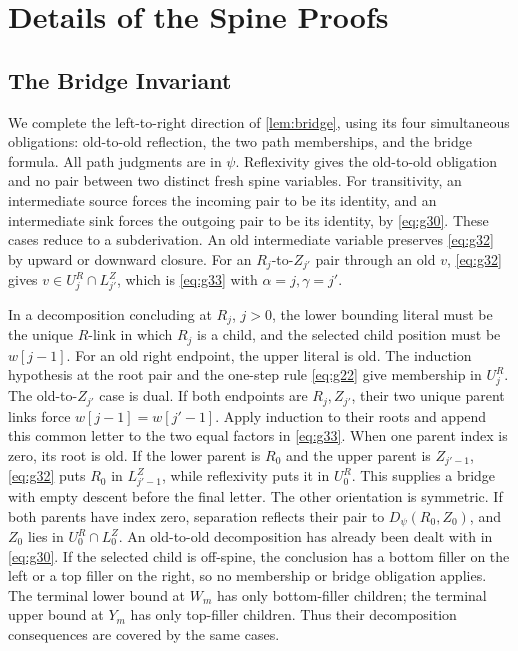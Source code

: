 \section{Details of the Spine Proofs}
\label{app:spine-proofs}

\subsection{The Bridge Invariant}
We complete the left-to-right direction of \cref{lem:bridge}, using its
four simultaneous obligations: old-to-old reflection, the two path
memberships, and the bridge formula. All path judgments are in $\psi$.
Reflexivity gives the old-to-old obligation and no pair between two distinct
fresh spine variables. For transitivity, an intermediate source forces the
incoming pair to be its identity, and an intermediate sink forces the outgoing
pair to be its identity, by \eqref{eq:g30}. These cases reduce to a subderivation.
An old intermediate variable preserves \eqref{eq:g32} by upward or downward closure.
For an $R_j$-to-$Z_{j'}$ pair through an old $v$, \eqref{eq:g32} gives
$v\in U^R_j\cap L^Z_{j'}$, which is \eqref{eq:g33} with $\alpha=j,\gamma=j'$.

In a decomposition concluding at $R_j$, $j>0$, the lower bounding
literal must be the unique $R$-link in which $R_j$ is a child, and
the selected child position must be $w[j-1]$. For an old right endpoint,
the upper literal is old. The induction hypothesis at the root pair and
the one-step rule \eqref{eq:g22} give membership in $U^R_j$. The old-to-$Z_{j'}$
case is dual. If both endpoints are $R_j,Z_{j'}$, their two unique parent
links force
$w[j-1]=w[j'-1]$. Apply induction to their roots and append this common
letter to the two equal factors in \eqref{eq:g33}. When one parent index is zero, its root is old. If the lower parent is
$R_0$ and the upper parent is $Z_{j'-1}$, \eqref{eq:g32} puts
$R_0$ in $L^Z_{j'-1}$, while reflexivity puts it in $U^R_0$.
This supplies a bridge with empty descent before the final letter.
The other orientation is symmetric. If both parents have index zero,
separation reflects their pair to $D_\psi(R_0,Z_0)$, and $Z_0$ lies
in $U^R_0\cap L^Z_0$.
An old-to-old decomposition has already been dealt with in \eqref{eq:g30}.
If the selected child is off-spine, the conclusion has a bottom filler on
the left or a top filler on the right, so no membership or bridge obligation
applies. The terminal lower bound at $W_m$ has only bottom-filler children;
the terminal upper bound at $Y_m$ has only top-filler children. Thus their
decomposition consequences are covered by the same cases.

